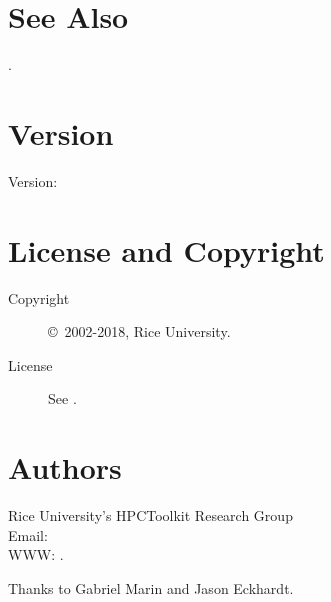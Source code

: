 \documentclass[english]{article}
\begin{document}



\section{See Also}

.

\section{Version}

Version: \Version

\section{License and Copyright}

\begin{description}
\item[Copyright] \copyright\ 2002-2018, Rice University.
\item[License] See .
\end{description}

\section{Authors}

\noindent
Rice University's HPCToolkit Research Group \\
Email:  \\
WWW: .

Thanks to Gabriel Marin and Jason Eckhardt.

\LatexManEnd
\end{document}
